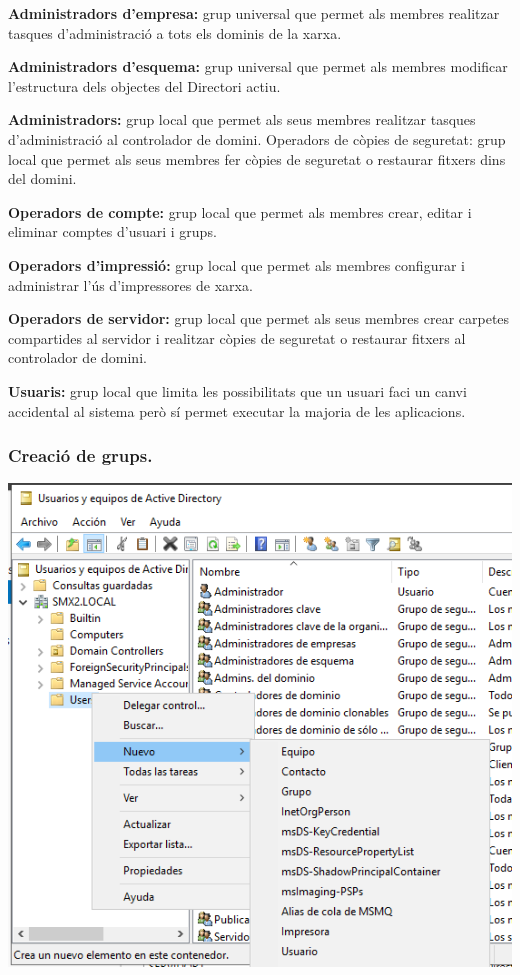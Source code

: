 \documentclass[
  a4paper,
]{article}
\begin{document}
\textbf{Administradors d'empresa:} grup universal que permet als membres
realitzar tasques d'administració a tots els dominis de la xarxa.

\textbf{Administradors d'esquema:} grup universal que permet als membres
modificar l'estructura dels objectes del Directori actiu.

\textbf{Administradors:} grup local que permet als seus membres
realitzar tasques d'administració al controlador de domini. Operadors de
còpies de seguretat: grup local que permet als seus membres fer còpies
de seguretat o restaurar fitxers dins del domini.

\textbf{Operadors de compte:} grup local que permet als membres crear,
editar i eliminar comptes d'usuari i grups.

\textbf{Operadors d'impressió:} grup local que permet als membres
configurar i administrar l'ús d'impressores de xarxa.

\textbf{Operadors de servidor:} grup local que permet als seus membres
crear carpetes compartides al servidor i realitzar còpies de seguretat o
restaurar fitxers al controlador de domini.

\textbf{Usuaris:} grup local que limita les possibilitats que un usuari
faci un canvi accidental al sistema però sí permet executar la majoria
de les aplicacions.

\subsubsection{Creació de grups.}\label{creaciuxf3-de-grups.}

\includegraphics{png/usuaris11.png}
\end{document}
